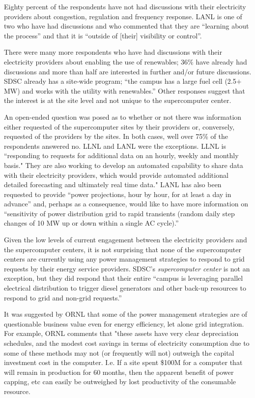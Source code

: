 Eighty percent of the respondents have not had discussions with their
electricity providers about congestion, regulation and frequency
response. LANL is one of two who have had discussions and who commented that
they are ``learning about the process'' and that it is ``outside of [their] visibility or control''.

There were many more respondents who have had discussions with their
electricity providers about enabling the use of renewables; 36{\%}
have already had discussions and more than half are interested in further
and/or future discussions. SDSC already has a site-wide program; ``the
campus has a large fuel cell (2.5$+$ MW) and works with the utility with
renewables.'' Other responses suggest that the interest is at the site level
and not unique to the supercomputer center.

An open-ended question was posed as to whether or not there was information
either requested of the supercomputer sites by their providers or,
conversely, requested of the providers by the sites. In both cases, well
over 75{\%} of the respondents answered no. LLNL and LANL were the
exceptions. LLNL is ``responding to requests for additional data on an hourly, 
weekly and monthly basis."  They are also working to develop an automated capability to share 
data with their electricity providers, which would provide automated additional 
detailed forecasting and ultimately real time data."
LANL has also been requested to provide ``power projections, hour by hour,
for at least a day in advance'' and, perhaps as a consequence, would like to
have more information on ``sensitivity of power distribution grid to rapid
transients (random daily step changes of 10 MW up or down within a single AC
cycle).''

Given the low levels of current engagement between the electricity
providers and the supercomputer centers, it is not surprising that none of
the supercomputer centers are currently using any power management
strategies to respond to grid requests by their energy service
providers. SDSC's \textit{supercomputer center} is not an exception, but they did respond that their
entire ``campus is leveraging parallel electrical distribution to trigger
diesel generators and other back-up resources to respond to grid and
non-grid requests.''

It was suggested by ORNL that some of the power management strategies 
are of questionable business value even for energy efficiency, let alone grid integration.
For example, ORNL comments that "these assets have very clear depreciation schedules, and the modest cost 
savings in terms of electricity consumption due to some of these methods may not (or frequently will not) 
outweigh the capital investment cost in the computer.  I.e. If a site spent \$100M for a computer that will 
remain in production for 60 months, then the 
apparent benefit of power capping, etc can easily be outweighed by lost productivity of the consumable resource.

